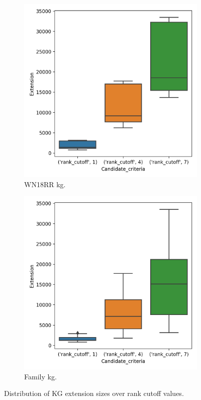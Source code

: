 \begin{figure}[htb]
\centering
\begin{subfigure}{.5\textwidth}
  \centering
  \includegraphics[width=1\linewidth]{figures/results/ranks/Extension_size_entity_wn18rr.png}
  \caption{WN18RR \gls{kg}.}
  \label{fig:rank_extension_wn18rr_boxplot_sub}
\end{subfigure}%
\begin{subfigure}{.5\textwidth}
  \centering
  \includegraphics[width=1\linewidth]{figures/results/ranks/Extension_size_entity_family.png}
  \caption{Family \gls{kg}.}
  \label{fig:rank_extension_family_boxplot_sub}
\end{subfigure}
\caption{Distribution of KG extension sizes over rank cutoff values.}
\label{rank_extensions_boxplot}
\end{figure}


